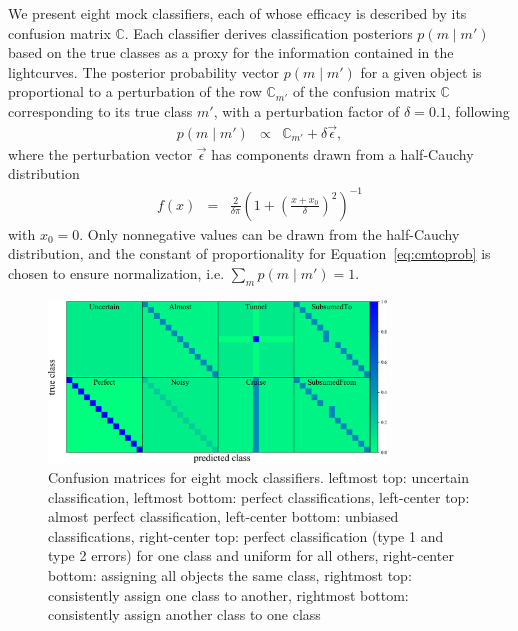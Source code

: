 We present eight mock classifiers, each of whose efficacy is described by its confusion matrix $\mathbb{C}$.
Each classifier derives classification posteriors $p(m \mid m')$ based on the true classes as a proxy for the information contained in the lightcurves.
The posterior probability vector $p(m \mid m')$ for a given object is proportional to a perturbation of the row $\mathbb{C}_{m'}$ of the confusion matrix $\mathbb{C}$ corresponding to its true class $m'$, with a perturbation factor of $\delta=0.1$, following
\begin{eqnarray}
  \label{eq:cmtoprob}
  p(m \mid m') &\propto& \mathbb{C}_{m'} + \delta\vec{\epsilon},
\end{eqnarray}
where the perturbation vector $\vec{\epsilon}$ has components drawn from a half-Cauchy distribution
\begin{eqnarray}
  \label{eq:cauchy}
  f(x) &=& \frac{2}{\delta\pi} \left(1+\left(\frac{x+x_{0}}{\delta}\right)^{2}\right)^{-1}
\end{eqnarray}
with $x_{0}=0$.
Only nonnegative values can be drawn from the half-Cauchy distribution, and the constant of proportionality for Equation~\ref{eq:cmtoprob} is chosen to ensure normalization, i.e. $\sum_{m}p(m \mid m')=1$.

\begin{figure}
	\begin{center}
    \includegraphics[width=0.8\textwidth]{./fig/all_sim_cm.png}
		\caption{Confusion matrices for eight mock classifiers.
    leftmost top: uncertain classification,
    leftmost bottom: perfect classifications,
    left-center top: almost perfect classification,
    left-center bottom: unbiased classifications,
    right-center top: perfect classification (type 1 and type 2 errors) for one class and uniform for all others,
    right-center bottom: assigning all objects the same class,
    rightmost top: consistently assign one class to another,
    rightmost bottom: consistently assign another class to one class}
		\label{fig:mock_cm}
	\end{center}
\end{figure}

